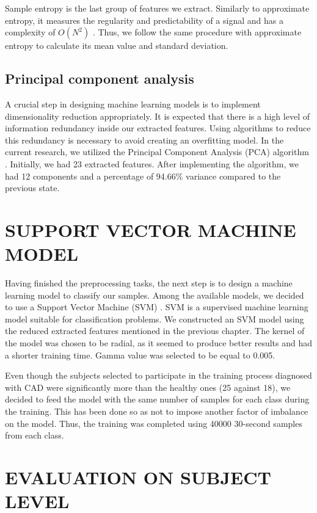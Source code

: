 Sample entropy is the last group of features we extract. Similarly to approximate entropy, it measures the regularity and predictability of a signal and has a complexity of $O(N^2)$ \cite{sampEn_article}. Thus, we follow the same procedure with approximate entropy to calculate its mean value and standard deviation.

\subsection{Principal component analysis}
\label{ssec:pca}

A crucial step in designing machine learning models is to implement dimensionality reduction appropriately. It is expected that there is a high level of information redundancy inside our extracted features. Using algorithms to reduce this redundancy is necessary to avoid creating an overfitting model. In the current research, we utilized the Principal Component Analysis (PCA) algorithm \cite{pca_article}. Initially, we had 23 extracted features. After implementing the algorithm, we had 12 components and a percentage of 94.66\% variance compared to the previous state.

\section{SUPPORT VECTOR MACHINE MODEL}
\label{sec:svm}

Having finished the preprocessing tasks, the next step is to design a machine learning model to classify our samples. Among the available models, we decided to use a Support Vector Machine (SVM) \cite{svm_article}. SVM is a supervised machine learning model suitable for classification problems. We constructed an SVM model using the reduced extracted features mentioned in the previous chapter. The kernel of the model was chosen to be radial, as it seemed to produce better results and had a shorter training time. Gamma value was selected to be equal to 0.005. 

Even though the subjects selected to participate in the training process diagnosed with CAD were significantly more than the healthy ones (25 against 18), we decided to feed the model with the same number of samples for each class during the training. This has been done so as not to impose another factor of imbalance on the model. Thus, the training was completed using 40000 30-second samples from each class.

\section{EVALUATION ON SUBJECT LEVEL}
\label{sec:subject_evaluation}

